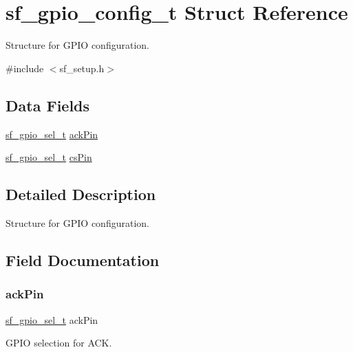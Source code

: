\hypertarget{structsf__gpio__config__t}{}\section{sf\+\_\+gpio\+\_\+config\+\_\+t Struct Reference}
\label{structsf__gpio__config__t}


Structure for G\+P\+IO configuration.  




{\ttfamily \#include $<$sf\+\_\+setup.\+h$>$}

\subsection*{Data Fields}
\begin{DoxyCompactItemize}
\item 
\mbox{\hyperlink{structsf__gpio__sel__t}{sf\+\_\+gpio\+\_\+sel\+\_\+t}} \mbox{\hyperlink{structsf__gpio__config__t_a02b33c24794de044e02bf779fe5ec494}{ack\+Pin}}
\item 
\mbox{\hyperlink{structsf__gpio__sel__t}{sf\+\_\+gpio\+\_\+sel\+\_\+t}} \mbox{\hyperlink{structsf__gpio__config__t_a01e95ad0a9d20140a3d2a73857bb5796}{cs\+Pin}}
\end{DoxyCompactItemize}


\subsection{Detailed Description}
Structure for G\+P\+IO configuration. 

\subsection{Field Documentation}
\mbox{\label{structsf__gpio__config__t_a02b33c24794de044e02bf779fe5ec494}} 
\subsubsection{\texorpdfstring{ackPin}{ackPin}}
{\footnotesize\ttfamily \mbox{\hyperlink{structsf__gpio__sel__t}{sf\+\_\+gpio\+\_\+sel\+\_\+t}} ack\+Pin}

G\+P\+IO selection for A\+CK. \mbox{\label{structsf__gpio__config__t_a01e95ad0a9d20140a3d2a73857bb5796}} 
